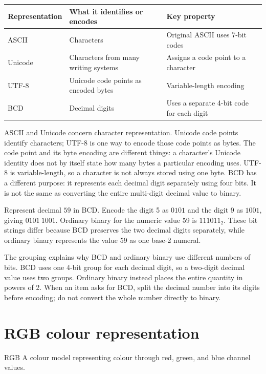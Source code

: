 \begin{center}
\begin{tabular}{p{}p{}p{}}
\toprule
\textbf{Representation} & \textbf{What it identifies or encodes} & \textbf{Key property}\\
\midrule
ASCII & Characters & Original ASCII uses 7-bit codes\\
Unicode & Characters from many writing systems & Assigns a code point to a character\\
UTF-8 & Unicode code points as encoded bytes & Variable-length encoding\\
BCD & Decimal digits & Uses a separate 4-bit code for each digit\\
\bottomrule
\end{tabular}
\end{center}

ASCII and Unicode concern character representation. Unicode code points
identify characters; UTF-8 is one way to encode those code points as bytes.
The code point and its byte encoding are different things: a character's
Unicode identity does not by itself state how many bytes a particular
encoding uses. UTF-8 is variable-length, so a character is not always stored
using one byte. BCD has a different purpose: it represents each decimal
digit separately using four bits. It is not the same as converting the
entire multi-digit decimal value to binary.

\begin{example}
Represent decimal $59$ in BCD. Encode the digit 5 as $0101$ and the digit 9
as $1001$, giving $0101\ 1001$. Ordinary binary for the numeric value 59 is
$111011_2$. These bit strings differ because BCD preserves the two decimal
digits separately, while ordinary binary represents the value 59 as one
base-2 numeral.
\end{example}

The grouping explains why BCD and ordinary binary use different numbers of
bits. BCD uses one 4-bit group for each decimal digit, so a two-digit
decimal value uses two groups. Ordinary binary instead places the entire
quantity in powers of 2. When an item asks for BCD, split the decimal
number into its digits before encoding; do not convert the whole number
directly to binary.

\section{RGB colour representation}
\begin{definitionbox}{RGB}
A colour model representing colour through red, green, and blue channel
values.
\end{definitionbox}

